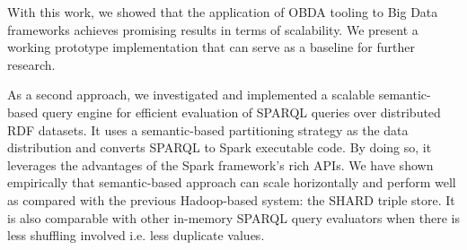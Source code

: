 With this work, we showed that the application of OBDA tooling to Big Data frameworks achieves promising results in terms of scalability. 
We present a working prototype implementation that can serve as a baseline for further research.

As a second approach, we investigated and implemented a scalable semantic-based query engine for efficient evaluation of SPARQL queries over distributed \gls{RDF} datasets. 
It uses a semantic-based partitioning strategy as the data distribution and converts \gls{SPARQL} to Spark executable code.
By doing so, it leverages the advantages of the Spark framework's rich \gls{API}s.
We have shown empirically that semantic-based approach can scale horizontally and perform well as compared with the previous Hadoop-based system: the SHARD triple store.
It is also comparable with other in-memory \gls{SPARQL} query evaluators when there is less shuffling involved i.e. less duplicate values.
